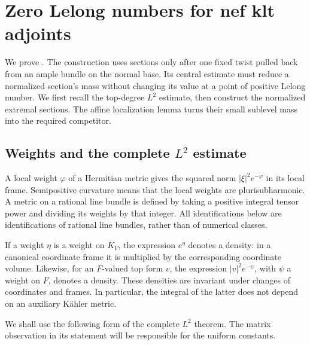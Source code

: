 \section{Zero Lelong numbers for nef klt adjoints}
\label{sec:adjoint-metrics}

We prove . The construction uses sections
only after one fixed twist pulled back from an ample bundle on the
normal base. Its central estimate must reduce a
normalized section's mass without changing its value at a point of
positive Lelong number. We first recall the top-degree $L^2$ estimate,
then construct the normalized extremal sections. The affine localization
lemma turns their small sublevel mass into the required competitor.

\subsection{Weights and the complete \texorpdfstring{$L^2$}{L2} estimate}

A local weight $\varphi$ of a Hermitian metric gives the squared norm
$|\xi|^2e^{-\varphi}$ in its local frame.  Semipositive curvature means
that the local weights are plurisubharmonic.  A metric on a rational
line bundle is defined by taking a positive integral tensor power and
dividing its weights by that integer.  All identifications below are
identifications of rational line bundles, rather than of numerical
classes.

If a weight $\eta$ is a weight on $K_V$, the expression $e^\eta$ denotes
a density: in a canonical coordinate frame it is multiplied by the
corresponding coordinate volume.  Likewise, for an $F$-valued top form
$v$, the expression $|v|^2e^{-\psi}$, with $\psi$ a weight on $F$,
denotes a density.  These densities are invariant under changes of
coordinates and frames.  In particular, the integral of the latter
does not depend on an auxiliary K\"ahler metric.

We shall use the following form of the complete $L^2$ theorem.  The
matrix observation in its statement will be responsible for the
uniform constants.

